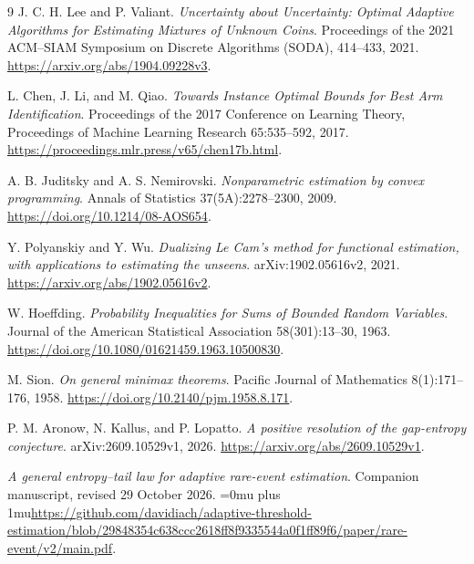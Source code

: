 \clearpage
{}
{}
\begin{thebibliography}{9}
J. C. H. Lee and P. Valiant.
\emph{Uncertainty about Uncertainty: Optimal Adaptive Algorithms for
Estimating Mixtures of Unknown Coins}.
Proceedings of the 2021 ACM--SIAM Symposium on Discrete Algorithms
(SODA), 414--433, 2021.
\url{https://arxiv.org/abs/1904.09228v3}.

L. Chen, J. Li, and M. Qiao.
\emph{Towards Instance Optimal Bounds for Best Arm Identification}.
Proceedings of the 2017 Conference on Learning Theory,
Proceedings of Machine Learning Research 65:535--592, 2017.
\url{https://proceedings.mlr.press/v65/chen17b.html}.

A. B. Juditsky and A. S. Nemirovski.
\emph{Nonparametric estimation by convex programming}.
Annals of Statistics 37(5A):2278--2300, 2009.
\url{https://doi.org/10.1214/08-AOS654}.

Y. Polyanskiy and Y. Wu.
\emph{Dualizing Le Cam's method for functional estimation, with
applications to estimating the unseens}.
arXiv:1902.05616v2, 2021.
\url{https://arxiv.org/abs/1902.05616v2}.

W. Hoeffding.
\emph{Probability Inequalities for Sums of Bounded Random Variables}.
Journal of the American Statistical Association 58(301):13--30, 1963.
\url{https://doi.org/10.1080/01621459.1963.10500830}.

M. Sion.
\emph{On general minimax theorems}.
Pacific Journal of Mathematics 8(1):171--176, 1958.
\url{https://doi.org/10.2140/pjm.1958.8.171}.

P. M. Aronow, N. Kallus, and P. Lopatto.
\emph{A positive resolution of the gap-entropy conjecture}.
arXiv:2609.10529v1, 2026.
\url{https://arxiv.org/abs/2609.10529v1}.

\emph{A general entropy--tail law for adaptive rare-event estimation}.
Companion manuscript, revised 29 October 2026.
{\Urlmuskip=0mu plus 1mu\url{https://github.com/davidiach/adaptive-threshold-estimation/blob/29848354c638ccc2618ff8f9335544a0f1ff89f6/paper/rare-event/v2/main.pdf}}.
\end{thebibliography}
